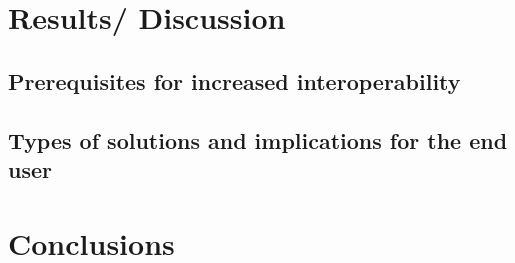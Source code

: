 \documentclass[12pt]{article}
\begin{document}
\section{Results/ Discussion}

\subsection{ Prerequisites for increased interoperability}

\subsection{Types of solutions and implications for the end user}


\section{Conclusions}


\newpage

\begin{appendix}


\end{appendix}

\newpage

 
 
\end{document}
